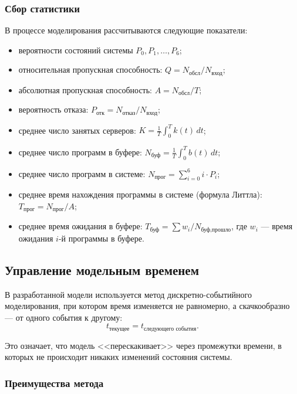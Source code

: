 \documentclass[14pt,a4paper]{extarticle}
\begin{document}
\subsubsection*{Сбор статистики}

В процессе моделирования рассчитываются следующие показатели:
\begin{itemize}
  \item вероятности состояний системы $P_0, P_1, \ldots, P_6$;
  \item относительная пропускная способность:
        $Q = N_{\text{обсл}} / N_{\text{вход}}$;
  \item абсолютная пропускная способность:
        $A = N_{\text{обсл}} / T$;
  \item вероятность отказа:
        $P_{\text{отк}} = N_{\text{отказ}} / N_{\text{вход}}$;
  \item среднее число занятых серверов:
        $K = \frac{1}{T}\int_0^T k(t)\,dt$;
  \item среднее число программ в буфере:
        $N_{\text{буф}} = \frac{1}{T}\int_0^T b(t)\,dt$;
  \item среднее число программ в системе:
        $N_{\text{прог}} = \sum_{i=0}^{6} i \cdot P_i$;
  \item среднее время нахождения программы в системе (формула Литтла):
        $T_{\text{прог}} = N_{\text{прог}} / A$;
  \item среднее время ожидания в буфере:
        $T_{\text{буф}} = \sum w_i / N_{\text{буф,прошло}}$,
        где $w_i$ --- время ожидания $i$-й программы в буфере.
\end{itemize}

\subsection{Управление модельным временем}

В разработанной модели используется метод дискретно-событийного моделирования,
при котором время изменяется не равномерно, а скачкообразно --- от одного события
к другому:
\[
  t_{\text{текущее}} = t_{\text{следующего события}}.
\]

Это означает, что модель <<перескакивает>> через промежутки времени, в которых не
происходит никаких изменений состояния системы.

\subsubsection*{Преимущества метода}
\end{document}
